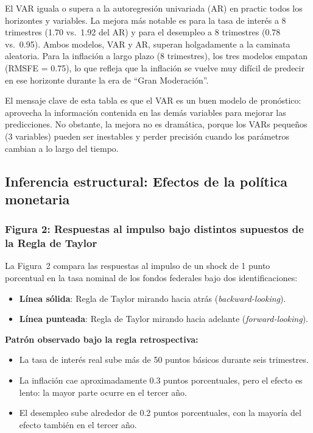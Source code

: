 \documentclass[12pt]{article}
\begin{document}
\begin{hallazgo}
El VAR iguala o supera a la autoregresi\'on univariada (AR) en practic todos los horizontes y variables. La mejora m\'as notable es para la tasa de inter\'es a 8 trimestres (1.70 vs.\ 1.92 del AR) y para el desempleo a 8 trimestres (0.78 vs.\ 0.95). Ambos modelos, VAR y AR, superan holgadamente a la caminata aleatoria. Para la inflaci\'on a largo plazo (8 trimestres), los tres modelos empatan (RMSFE = 0.75), lo que refleja que la inflaci\'on se vuelve muy dif\'icil de predecir en ese horizonte durante la era de ``Gran Moderaci\'on''.
\end{hallazgo}

\begin{intuicion}
El mensaje clave de esta tabla es que el VAR es un buen modelo de pron\'ostico: aprovecha la informaci\'on contenida en las dem\'as variables para mejorar las predicciones. No obstante, la mejora no es dram\'atica, porque los VARs peque\~nos (3 variables) pueden ser inestables y perder precisi\'on cuando los par\'ametros cambian a lo largo del tiempo.
\end{intuicion}

\subsection{Inferencia estructural: Efectos de la pol\'itica monetaria}

\subsubsection{Figura 2: Respuestas al impulso bajo distintos supuestos de la Regla de Taylor}

La Figura~2 compara las respuestas al impulso de un shock de 1 punto porcentual en la tasa nominal de los fondos federales bajo dos identificaciones:

\begin{itemize}
  \item \textbf{L\'inea s\'olida}: Regla de Taylor mirando hacia atr\'as (\textit{backward-looking}).
  \item \textbf{L\'inea punteada}: Regla de Taylor mirando hacia adelante (\textit{forward-looking}).
\end{itemize}

\textbf{Patr\'on observado bajo la regla retrospectiva:}
\begin{itemize}
  \item La tasa de inter\'es real sube m\'as de 50 puntos b\'asicos durante seis trimestres.
  \item La inflaci\'on cae aproximadamente 0.3 puntos porcentuales, pero el efecto es lento: la mayor parte ocurre en el tercer a\~no.
  \item El desempleo sube alrededor de 0.2 puntos porcentuales, con la mayor\'{i}a del efecto tambi\'en en el tercer a\~no.
\end{itemize}
\end{document}
